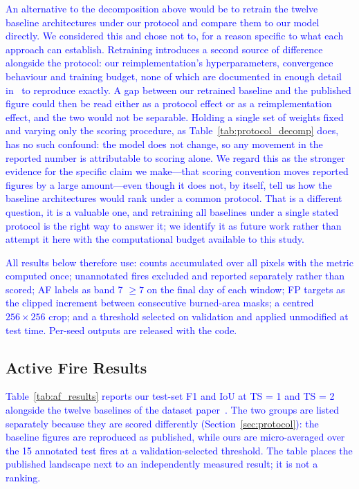 \documentclass[sensors,article,submit,moreauthors,pdftex]{Definitions/mdpi}
\newcommand{\rev}[1]{\textcolor{blue}{#1}}
\begin{document}
\rev{An alternative to the decomposition above would be to retrain the twelve
baseline architectures under our protocol and compare them to our model
directly. We considered this and chose not to, for a reason specific to what
each approach can establish. Retraining introduces a second source of
difference alongside the protocol: our reimplementation's hyperparameters,
convergence behaviour and training budget, none of which are documented in
enough detail in~\cite{zhao2025tssatfire} to reproduce exactly. A gap between
our retrained baseline and the published figure could then be read either as a
protocol effect or as a reimplementation effect, and the two would not be
separable. Holding a single set of weights fixed and varying only the scoring
procedure, as Table~\ref{tab:protocol_decomp} does, has no such confound: the
model does not change, so any movement in the reported number is attributable
to scoring alone. We regard this as the stronger evidence for the specific claim
we make---that scoring convention moves reported figures by a large amount---even
though it does not, by itself, tell us how the baseline architectures would rank
under a common protocol. That is a different question, it is a valuable one, and
retraining all baselines under a single stated protocol is the right way to
answer it; we identify it as future work rather than attempt it here with the
computational budget available to this study.}

\rev{All results below therefore use: counts accumulated over all pixels with
the metric computed once; unannotated fires excluded and reported separately
rather than scored; AF labels as band 7 $\geq 7$ on the final day of each
window; FP targets as the clipped increment between consecutive burned-area
masks; a centred $256 \times 256$ crop; and a threshold selected on validation
and applied unmodified at test time. Per-seed outputs are released with the
code.}


\subsection{Active Fire Results}
\label{sec:afresults}

\rev{Table~\ref{tab:af_results} reports our test-set F1 and IoU at TS = 1 and
TS = 2 alongside the twelve baselines of the dataset
paper~\cite{zhao2025tssatfire}. The two groups are listed separately because
they are scored differently (Section~\ref{sec:protocol}): the baseline figures
are reproduced as published, while ours are micro-averaged over the 15 annotated
test fires at a validation-selected threshold. The table places the published
landscape next to an independently measured result; it is not a ranking.}
\end{document}
